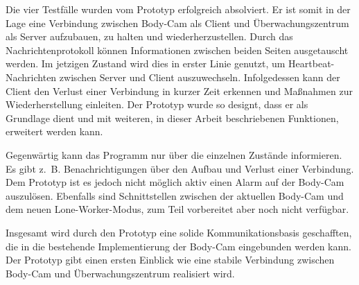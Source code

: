 \documentclass[thesis.tex]{subfiles}
\begin{document}
\pagebreak

Die vier Testfälle wurden vom Prototyp erfolgreich absolviert.
Er ist somit in der Lage eine Verbindung zwischen Body-Cam als Client und Überwachungszentrum als Server aufzubauen, zu halten und wiederherzustellen.
Durch das Nachrichtenprotokoll können Informationen zwischen beiden Seiten ausgetauscht werden.
Im jetzigen Zustand wird dies in erster Linie genutzt, um Heartbeat-Nachrichten zwischen Server und Client auszuwechseln.
Infolgedessen kann der Client den Verlust einer Verbindung in kurzer Zeit erkennen und Maßnahmen zur Wiederherstellung einleiten.
Der Prototyp wurde so designt, dass er als Grundlage dient und mit weiteren, in dieser Arbeit beschriebenen Funktionen, erweitert werden kann.

Gegenwärtig kann das Programm nur über die einzelnen Zustände informieren.
Es gibt z.~B. Benachrichtigungen über den Aufbau und Verlust einer Verbindung.
Dem Prototyp ist es jedoch nicht möglich aktiv einen Alarm auf der Body-Cam auszulösen.
Ebenfalls sind Schnittstellen zwischen der aktuellen Body-Cam und dem neuen Lone-Worker-Modus, zum Teil vorbereitet aber noch nicht verfügbar.

Insgesamt wird durch den Prototyp eine solide Kommunikationsbasis geschafften, die in die bestehende Implementierung der Body-Cam eingebunden werden kann.
Der Prototyp gibt einen ersten Einblick wie eine stabile Verbindung zwischen Body-Cam und Überwachungszentrum realisiert wird.

\subfilebib %
\end{document}
